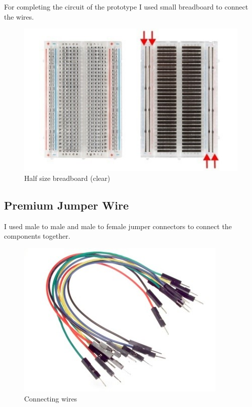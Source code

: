 \documentclass[14pt,a4paper]{extarticle}
\begin{document}
	For completing the circuit of the prototype I used small breadboard to connect the wires. 
	
	\begin{figure}[H]
		\includegraphics[center]{breadboard.jpg}
		\caption{Half size breadboard (clear)}
	\end{figure}
	
	\subsection{Premium Jumper Wire}
	
	I used male to male and male to female jumper connectors to connect the components together.
	
	\begin{figure}[H]
		\includegraphics[center]{jumper.jpg}
		\caption{Connecting wires}
	\end{figure}
\end{document}
